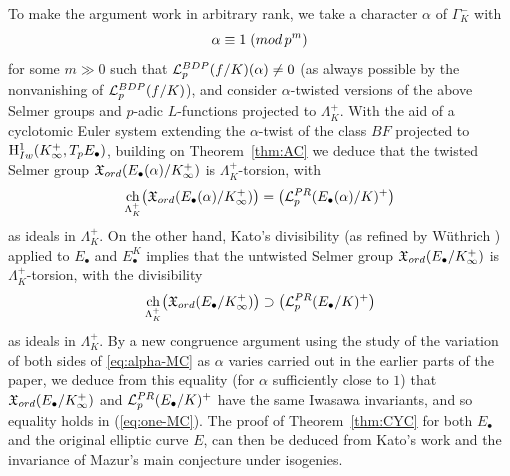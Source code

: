 \documentclass[a4paper,10pt]{amsart}
\numberwithin{equation}{section}
\numberwithin{equation}{section}
\theoremstyle{plain}
\theoremstyle{definition}
\theoremstyle{definition}
\theoremstyle{plain}
\theoremstyle{plain}
\theoremstyle{plain}
\theoremstyle{plain}
\newcommand{\Z}{\mathbb{Z}}
\newcommand{\Q}{\mathbb{Q}}
\newcommand{\X}{\mathfrak{X}}
\DeclareMathOperator{\ch}{ch}
\newcommand{\Lcal}{\mathcal{L}}
\newcommand{\rH}{\mathrm{H}}
\begin{document}
To make the argument work in arbitrary rank, we take a character $\alpha$ of $\Gamma_K^-$ with
\[
\alpha\equiv 1\;({\rm mod}\,p^m)
\]
for some $m\gg 0$ such that $\Lcal_p^{\rm BDP}(f/K)(\alpha)\neq 0$ (as always possible by the nonvanishing of $\Lcal_p^{\rm BDP}(f/K)$), and consider $\alpha$-twisted versions of the above Selmer groups and $p$-adic $L$-functions projected to $\Lambda_K^+$. With the aid of a cyclotomic Euler system extending the $\alpha$-twist of the class $BF$ projected to $\rH^1_{\rm Iw}(K_\infty^+,T_pE_\bullet)$, building on Theorem~\ref{thm:AC} we deduce that the twisted Selmer group $\mathfrak{X}_{\rm ord}(E_\bullet(\alpha)/K_\infty^+)$ is $\Lambda_K^+$-torsion, with
\begin{equation}\label{eq:alpha-MC}
\ch_{\Lambda_K^+}\bigl(\X_{\rm ord}(E_\bullet(\alpha)/K_\infty^+)\bigr)=\bigl(\Lcal_p^{\rm PR}(E_\bullet(\alpha)/K)^+\bigr)
\end{equation} 
as ideals in $\Lambda_K^+$. On the other hand, Kato's divisibility \cite{kato-euler-systems} (as refined by W\"uthrich \cite{wuthrich-int}) applied to $E_\bullet$ and $E_\bullet^K$ implies that the untwisted Selmer group $\mathfrak{X}_{\rm ord}(E_\bullet/K_\infty^+)$ is $\Lambda_K^+$-torsion, with the divisibility
\begin{equation}\label{eq:one-MC}
\ch_{\Lambda_K^+}\bigl(\X_{\rm ord}(E_\bullet/K_\infty^+)\bigr)\supset\bigl(\Lcal_p^{\rm PR}(E_\bullet/K)^+\bigr)
\end{equation} 
as ideals in $\Lambda_K^+$. By a new congruence argument using the study of the variation of both sides of \eqref{eq:alpha-MC} as $\alpha$ varies carried out in the earlier parts of the paper, %
we deduce from this equality (for $\alpha$ sufficiently close to $1$) that $\X_{\rm ord}(E_\bullet/K_\infty^+)$ and $\Lcal_p^{\rm PR}(E_\bullet/K)^+$ have the same Iwasawa invariants, and so equality holds in (\ref{eq:one-MC}). The proof of Theorem~\ref{thm:CYC} for both $E_\bullet$ and the original elliptic curve $E$, can then be deduced from Kato's work and the invariance of Mazur's main conjecture under isogenies.  

\end{document}
